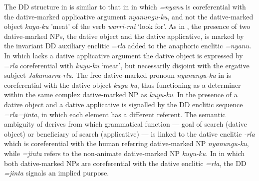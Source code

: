 \documentclass[output=paper]{../langscibook}
\begin{document}


\z
\z


The DD structure in  is similar to that in  in which \textit{=nyanu} is coreferential with the dative-marked applicative argument \textit{nyanungu-ku}, and not the dative-marked object \textit{kuyu-ku} {}'meat' of the verb \textit{warri-rni} `look for'. As in , the presence of two dative-marked NPs, the dative object and the dative applicative, is marked by the invariant DD auxiliary enclitic =\textit{rla} added to the anaphoric enclitic \textit{=nyanu.} In  which lacks a dative applicative argument the dative object is expressed by =\textit{rla} coreferential with \textit{kuyu-ku} `meat', but necessarily disjoint with the ergative subject \textit{Jakamarra-rlu}. The free dative-marked pronoun \textit{nyanungu-ku} in  is coreferential with the dative object \textit{kuyu-ku}, thus functioning as a determiner within the same complex dative-marked NP as \textit{kuyu-ku}. In  the presence of a dative object and a dative applicative is signalled by the DD enclitic sequence \textit{=rla=jinta}, in which each element has a different referent. The semantic ambiguity of  derives from which grammatical function — goal of search (dative object)  or beneficiary of search (applicative) — is linked to the dative enclitic \textit{{}-rla} which is coreferential with the human referring dative-marked NP \textit{nyanungu-ku}, while \textit{=jinta} refers to the non-animate dative-marked NP \textit{kuyu-ku.} In  in which both dative-marked NPs are coreferential with the dative enclitic \textit{=rla}, the DD \textit{=jinta} signals an implied purpose.
\end{document}
